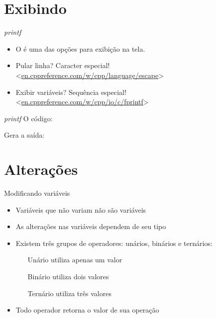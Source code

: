 \documentclass[11pt]{beamer}
\begin{document}
\section{Exibindo}
	\begin{frame}{\textit{printf}}
		\begin{itemize}
			\presentationPause\item O  é uma das opções para exibição na tela.
			\presentationPause\item Pular linha? Caracter especial! <\href{http://en.cppreference.com/w/cpp/language/escape}{en.cppreference.com/w/cpp/language/escape}>
			\presentationPause\item Exibir variáveis? Sequência especial! <\href{http://en.cppreference.com/w/cpp/io/c/fprintf}{en.cppreference.com/w/cpp/io/c/fprintf}>
		\end{itemize}
		\presentationPause
	\end{frame}\begin{frame}{\textit{printf}}
		O código:
		

		\presentationPause
		Gera a saída:
		
	\end{frame}

\section{Alterações}
	\begin{frame}{Modificando variáveis}
		\begin{itemize}
			\presentationPause\item Variáveis que não variam não são variáveis
			\presentationPause\item As alterações nas variáveis dependem de seu tipo
			\presentationPause\item Existem três grupos de operadores: unários, binários e ternários:
			\begin{itemize}
				\presentationPause\item[Unário] utiliza apenas um valor
				\presentationPause\item[Binário] utiliza dois valores
				\presentationPause\item[Ternário] utiliza três valores
			\end{itemize}
			\presentationPause\item Todo operador retorna o valor de sua operação
		\end{itemize}
	\end{frame}
\end{document}
